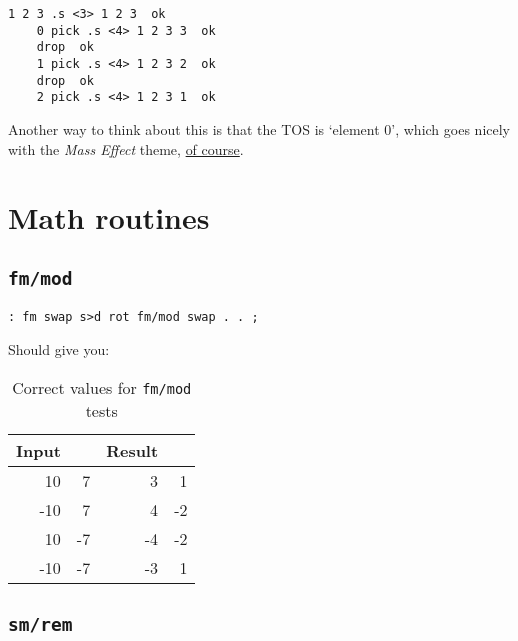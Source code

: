 \begin{lstlisting}[frame=lines]
	1 2 3 .s <3> 1 2 3  ok
	0 pick .s <4> 1 2 3 3  ok
	drop  ok
	1 pick .s <4> 1 2 3 2  ok
	drop  ok
	2 pick .s <4> 1 2 3 1  ok
\end{lstlisting}

\noindent Another way to think about this is that the TOS is `element 0', which
goes nicely with the \textit{Mass Effect} theme, \href{http://masseffect.wikia.com/wiki/Element\_Zero}{of
course}.


\section{Math routines}



\subsection{\texttt{fm/mod}}

\begin{lstlisting}[frame=lines]
        : fm swap s>d rot fm/mod swap . . ; 
\end{lstlisting}

\noindent Should give you: 

\begin{table}[h!]
\centering
\begin{tabular}{ | r r || r r | }
        \hline
	Input & & Result & \\
        \hline
         10 &  7 &  3 &  1\\
        -10 &  7 &  4 & -2 \\
         10 & -7 & -4 & -2\\
        -10 & -7 &  -3 &  1\\
        \hline
\end{tabular}
        \caption{Correct values for \texttt{fm/mod} tests}
        \label{table_fmmod}
\end{table}


\subsection{\texttt{sm/rem}}

